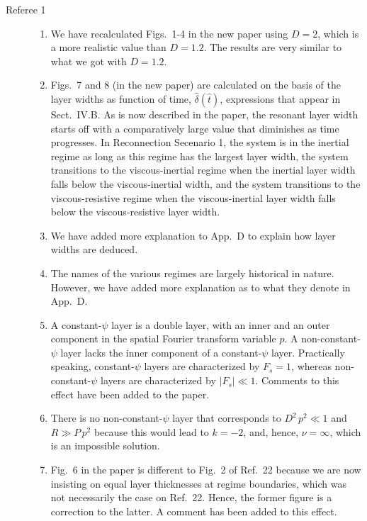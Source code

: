 \documentclass{article}[12pt]
\begin{document}
\begin{description}
\item[Referee 1]

\begin{enumerate}

\item We have recalculated Figs.~1-4 in the new paper using $D=2$, which is a more realistic value than $D=1.2$. The results are very similar to what we got with $D=1.2$. 

\item Figs.~7 and 8 (in the new paper) are calculated on the basis of the layer widths as function of time, $\hat{\delta}(\hat{t})$, expressions that appear in Sect.~IV.B.
As is now described in the paper, the resonant layer width starts off with a comparatively large value that diminishes as time progresses. In
Reconnection Secenario 1, the system is in the inertial regime as long as this regime has the largest layer width, the system transitions to the
viscous-inertial regime when the inertial layer width falls below the viscous-inertial width, and the system transitions to the viscous-resistive regime
when the viscous-inertial layer width falls below the viscous-resistive layer width. 

\item We have added more explanation to App.~D to explain how layer widths are deduced. 

\item The names of the various regimes are largely historical in nature. However, we have added more explanation as to what they denote in
App.~D. 

\item A constant-$\psi$ layer is a double layer, with an inner and an outer component in the spatial Fourier transform variable $p$. A non-constant-$\psi$ layer lacks the
inner component of a constant-$\psi$ layer. Practically speaking, constant-$\psi$ layers are characterized by $F_s=1$, whereas
non-constant-$\psi$ layers are characterized by $|F_s|\ll 1$. Comments to this effect have been added to the paper. 

\item There is no non-constant-$\psi$ layer that corresponds to $D^2\,p^2\ll 1$ and $R\gg P\,p^2$ because this would lead to
$k=-2$, and, hence, $\nu=\infty$, which is an impossible solution. 

\item Fig.~6 in the paper is different to Fig.~2 of Ref.~22 because we are now insisting on equal layer thicknesses at regime boundaries, which
was not necessarily the case on Ref.~22. Hence, the former figure is a correction to the latter. A comment has been added to this effect. 
\end{enumerate}


\end{description}
\end{document}
